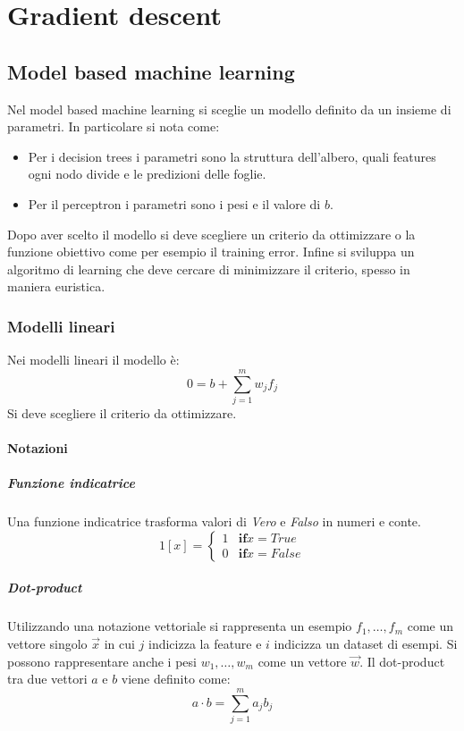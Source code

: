 \chapter{Gradient descent}

\section{Model based machine learning}
Nel model based machine learning si sceglie un modello definito da un insieme di parametri.
In particolare si nota come:
\begin{multicols}{2}
	\begin{itemize}
		\item Per i decision trees i parametri sono la struttura dell'albero, quali features ogni nodo divide e le predizioni delle foglie.
		\item Per il perceptron i parametri sono i pesi e il valore di $b$.
	\end{itemize}
\end{multicols}
Dopo aver scelto il modello si deve scegliere un criterio da ottimizzare o la funzione obiettivo come per esempio il training error.
Infine si sviluppa un algoritmo di learning che deve cercare di minimizzare il criterio, spesso in maniera euristica.

	\subsection{Modelli lineari}
	Nei modelli lineari il modello \`e:
	$$0=b+\sum\limits_{j=1}^mw_jf_j$$
	Si deve scegliere il criterio da ottimizzare.

		\subsubsection{Notazioni}

			\paragraph{Funzione indicatrice}
			Una funzione indicatrice trasforma valori di \emph{Vero} e \emph{Falso} in numeri e conte.
			$$1[x]=\begin{cases}1&\mathbf{if} x = True\\
										  	0&\textbf{if} x = False
				 	\end{cases}$$

			\paragraph{Dot-product}
			Utilizzando una notazione vettoriale si rappresenta un esempio $f_1,\dots,f_m$ come un vettore singolo $\overrightarrow{x}$ in cui $j$ indicizza la feature e $i$ indicizza un dataset di esempi.
			Si possono rappresentare anche i pesi $w_1,\dots,w_m$ come un vettore $\overrightarrow{w}$.
			Il dot-product tra due vettori $a$ e $b$ viene definito come:
			$$a\cdot b = \sum\limits_{j=1}^ma_jb_j$$

